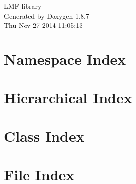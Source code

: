 \documentclass[twoside]{book}
\newcommand{\+}{\discretionary{\mbox{\scriptsize$\hookleftarrow$}}{}{}}
\newcommand{\clearemptydoublepage}{%
  \newpage{\pagestyle{empty}\cleardoublepage}%
}
\begin{document}
\hypersetup{pageanchor=false,
             bookmarks=true,
             bookmarksnumbered=true,
             pdfencoding=unicode
            }
\begin{titlepage}
\vspace*{7cm}
\begin{center}%
{\Large L\+M\+F library }\\
\vspace*{1cm}
{\large Generated by Doxygen 1.8.7}\\
\vspace*{0.5cm}
{\small Thu Nov 27 2014 11:05:13}\\
\end{center}
\end{titlepage}
\clearemptydoublepage
\tableofcontents
\clearemptydoublepage
{}
\hypersetup{pageanchor=true}

\chapter{Namespace Index}

\chapter{Hierarchical Index}

\chapter{Class Index}

\chapter{File Index}

\end{document}
